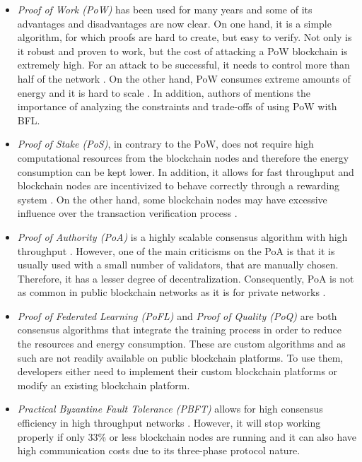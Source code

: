 \begin{itemize}
    \item \textit{Proof of Work (PoW)} has been used for many years and some of its advantages and disadvantages are now clear. On one hand, it is a simple algorithm, for which proofs are hard to create, but easy to verify. Not only is it robust and proven to work, but the cost of attacking a PoW blockchain is extremely high. For an attack to be successful, it needs to control more than half of the network \cite{li_blockchain_2021}. On the other hand, PoW consumes extreme amounts of energy and it is hard to scale \cite{edwood_2020, li_blockchain_2021, ccaf}. In addition, authors of \cite{10.48550/arxiv.2112.07938} mentions the importance of analyzing the constraints and trade-offs of using PoW with BFL.

    \item \textit{Proof of Stake (PoS)}, in contrary to the PoW, does not require high computational resources from the blockchain nodes and therefore the energy consumption can be kept lower. In addition, it allows for fast throughput and blockchain nodes are incentivized to behave correctly through a rewarding system \cite{li_blockchain_2021}. On the other hand, some blockchain nodes may have excessive influence over the transaction verification process \cite{li_blockchain_2021}.
    
    \item \textit{Proof of Authority (PoA)} is a highly scalable consensus algorithm with high throughput \cite{binance_academy_2020}. However, one of the main criticisms on the PoA is that it is usually used with a small number of validators, that are manually chosen. Therefore, it has a lesser degree of decentralization. Consequently, PoA is not as common in public blockchain networks as it is for private networks \cite{bPoA}.

    \item \textit{Proof of Federated Learning (PoFL)} \cite{9347812, 10.48550/arxiv.2007.15145} and \textit{Proof of Quality (PoQ)} \cite{8843900} are both consensus algorithms that integrate the training process in order to reduce the resources and energy consumption. These are custom algorithms and as such are not readily available on public blockchain platforms. To use them, developers either need to implement their custom blockchain platforms or modify an existing blockchain platform.

    \item \textit{Practical Byzantine Fault Tolerance (PBFT)} allows for high consensus efficiency in high throughput networks \cite{li_blockchain_2021}. However, it will stop working properly if only 33\% or less blockchain nodes are running and it can also have high communication costs due to its three-phase protocol nature.


\end{itemize}
